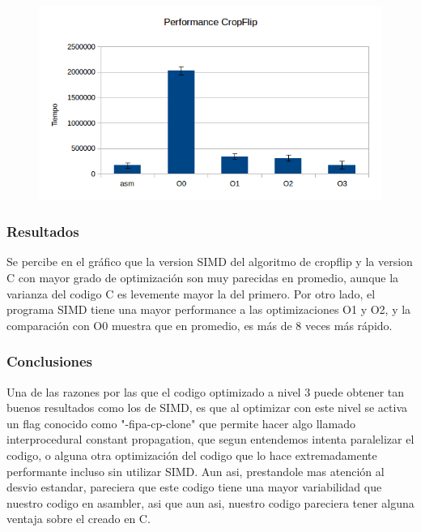 \documentclass[a4paper]{article}
\begin{document}
\begin{figure}[h!]
  \begin{center}
	\includegraphics[scale=0.66]{Graficos1.4/crop/per.jpg}
	\label{nombreparareferenciar5}
  \end{center}
\end{figure}

\subsubsection{Resultados}

Se percibe en el gráfico que la version SIMD del algoritmo de cropflip  y la version C con mayor grado de optimización son muy parecidas en promedio, aunque la varianza del codigo C es levemente mayor la del primero. Por otro lado, el programa SIMD tiene una mayor performance a las optimizaciones O1 y O2, y la comparación con O0 muestra que en promedio, es más de 8 veces más rápido.

\subsubsection{Conclusiones}
Una de las razones por las que el codigo optimizado a nivel 3 puede obtener tan buenos resultados como los de SIMD, es que al optimizar con este nivel se activa un flag conocido como "-fipa-cp-clone" que permite hacer algo llamado interprocedural constant propagation, que segun entendemos intenta paralelizar el codigo, o alguna otra optimización del codigo que lo hace extremadamente performante incluso sin utilizar SIMD. Aun asi, prestandole mas atención al desvio estandar, pareciera que este codigo tiene una mayor variabilidad que nuestro codigo en asambler, asi que aun asi, nuestro codigo pareciera tener alguna ventaja sobre el creado en C.
\end{document}
